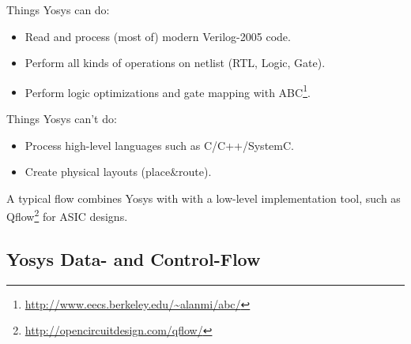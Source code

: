 \begin{frame}{\subsecname}

Things Yosys can do:
\begin{itemize}
\item Read and process (most of) modern Verilog-2005 code.
\item Perform all kinds of operations on netlist (RTL, Logic, Gate).
\item Perform logic optimizations and gate mapping with ABC\footnote[frame]{\url{http://www.eecs.berkeley.edu/~alanmi/abc/}}.
\end{itemize}

\bigskip
Things Yosys can't do:
\begin{itemize}
\item Process high-level languages such as C/C++/SystemC.
\item Create physical layouts (place\&route).
\end{itemize}

\bigskip
A typical flow combines Yosys with with a low-level implementation tool, such
as Qflow\footnote[frame]{\url{http://opencircuitdesign.com/qflow/}} for ASIC designs.

\end{frame}


\subsection{Yosys Data- and Control-Flow}

